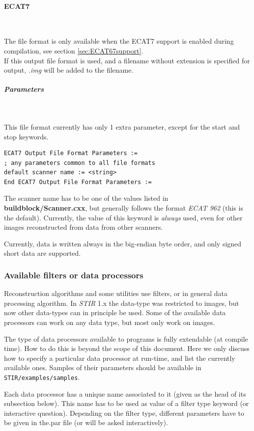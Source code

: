 \documentclass{article}
\newcommand{\subsubsubsection}[1]{\paragraph{#1}\mbox{} \\}
\newcommand{\subsubsubsubsection}[1]{\subparagraph{#1} \mbox{} \\}
\begin{document}
{{{ \subsubsubsection{ECAT7}
}
The file format is only available when the ECAT7 support is enabled 
during compilation, see section \ref{sec:ECAT67support}.\\
If this output file format is used, and a filename without extension 
is specified for output, \textit{.img} will be added to the filename.

{ \subsubsubsubsection{Parameters}
}
This file format currently has only 1 extra parameter, except 
for the start and stop keywords.

\begin{verbatim}
ECAT7 Output File Format Parameters :=
; any parameters common to all file formats
default scanner name := <string>
End ECAT7 Output File Format Parameters :=
\end{verbatim}

The scanner name has to be one of the values listed in \textbf{buildblock/Scanner.cxx}, 
but generally follows the format \textit{ECAT 962} (this is the default). 
Currently, the value of this keyword is \textit{always} used, even 
for other images reconstructed from data from other scanners.


Currently, data is written always in the big-endian byte order, 
and only signed short data are supported.



\subsubsection{
Available filters or data processors}
\label{sec:filters}
Reconstruction algorithms and some utilities use filters, or in 
general data processing algorithm. In \textit{STIR} 1.x the data-type was restricted
to images, but now other data-types can in principle be used. Some
of the available data processors can work on any data type, but most
only work on images.

The type of data processors 
available to programs is fully extendable (at compile time). 
How to do this is beyond the scope of this document. Here we 
only discuss how to specify a particular data processor at run-time, 
and list the currently available ones. Samples of their parameters 
should be available in \texttt{STIR/examples/samples}.


Each data processor has a unique name associated to it (given 
as the head of its subsection below). This name has to be used 
as value of a filter type keyword (or interactive question). 
Depending on the filter type, different parameters have to be 
given in the.par file (or will be asked interactively).


}}
\end{document}
